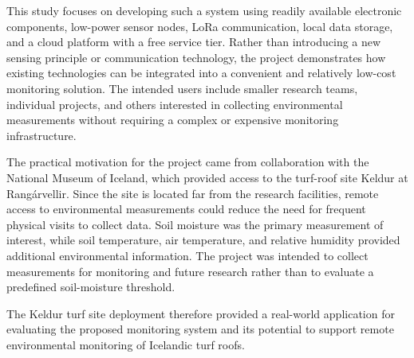This study focuses on developing such a system using readily available electronic components, low-power sensor nodes, LoRa communication, local data storage, and a cloud platform with a free service tier. Rather than introducing a new sensing principle or communication technology, the project demonstrates how existing technologies can be integrated into a convenient and relatively low-cost monitoring solution. The intended users include smaller research teams, individual projects, and others interested in collecting environmental measurements without requiring a complex or expensive monitoring infrastructure.

The practical motivation for the project came from collaboration with the National Museum of Iceland, which provided access to the turf-roof site Keldur at Rangárvellir. Since the site is located far from the research facilities, remote access to environmental measurements could reduce the need for frequent physical visits to collect data. Soil moisture was the primary measurement of interest, while soil temperature, air temperature, and relative humidity provided additional environmental information. The project was intended to collect measurements for monitoring and future research rather than to evaluate a predefined soil-moisture threshold.

The Keldur turf site deployment therefore provided a real-world application for evaluating the proposed monitoring system and its potential to support remote environmental monitoring of Icelandic turf roofs.